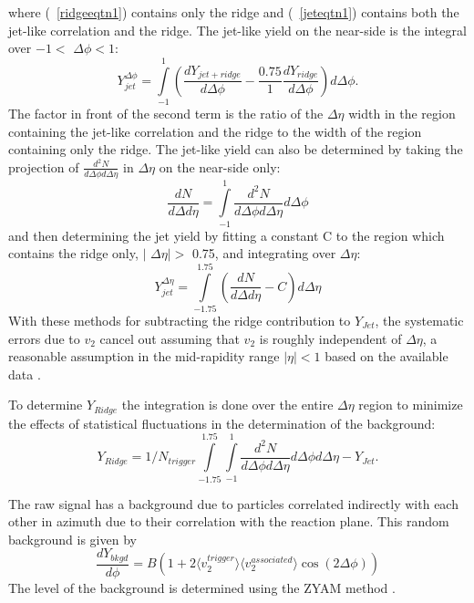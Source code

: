 \documentclass[aps,prc,twocolumn,groupedaddress,showpacs,preprintnumbers,amsmath,amssymb]{revtex4}
\newcommand{\jet}{jet-like correlation\xspace}
\newcommand{\ridge}{ridge\xspace}
\newcommand{\dphi}{$\Delta\phi$\xspace}
\newcommand{\deta}{$\Delta\eta$\xspace}
\newcommand{\vtwo}{$v_2$\xspace}
\newcommand{\ns}{near-side\xspace}
\newcommand{\nearside}{near-side\xspace}
\newcommand{\jl}{jet-like\xspace}
\newcommand{\Eref}[1]{(~\ref{#1})}
\newcommand{\njet}{$Y_{Jet}$\xspace}
\newcommand{\nridge}{$Y_{Ridge}$\xspace}
\begin{document}
where \Eref{ridgeeqtn1} contains only the \ridge and \Eref{jeteqtn1} contains both the \jet and the \ridge.  The \jl yield on the \nearside is the integral over $-1<$ \dphi $<1$:
\begin{equation}
Y_{jet}^{\Delta\phi} = \int\limits_{-1}^{1} ( \frac{dY_{jet+ridge}}{d\Delta\phi} - \frac{0.75}{1}  \frac{dY_{ridge}}{d\Delta\phi} ) d\Delta\phi. \label{jetphieqtn}
\end{equation}
The factor in front of the second term is the ratio of the \deta width in the region containing the \jet and the \ridge to the width of the region containing only the \ridge.  The jet-like yield can also be determined by taking the projection of $\frac{d^2N}{d\Delta\phi d\Delta\eta}$ in \deta on the \ns only:
\begin{equation} 
\frac{dN}{d\Delta d\eta} = \int\limits_{-1}^{1} \frac{d^2N}{d\Delta\phi d\Delta\eta} d\Delta\phi \label{jeteqtn2}
\end{equation}
and then determining the jet yield by fitting a constant C to the region which contains the \ridge only, $|$ \deta $| >$ 0.75, and integrating over \deta:
\begin{equation} 
Y_{jet}^{\Delta\eta} = \int\limits_{-1.75}^{1.75} (\frac{dN}{d\Delta d\eta} - C) d\Delta\eta \label{jeteqtn3}
\end{equation}
With these methods for subtracting the \ridge contribution to \njet, the systematic errors due to \vtwo cancel out assuming that \vtwo is roughly independent of \deta, a reasonable assumption in the mid-rapidity range $|\eta| < 1$ based on the available data \cite{phobosFlow1,phobosFlow2}.

To determine \nridge the integration is done over the entire \deta region to minimize the effects of statistical fluctuations in the determination of the background:
\begin{equation}
Y_{Ridge} = 1/N_{trigger} \int\limits_{-1.75}^{1.75} \int\limits_{-1}^{1} \frac{d^2N}{d\Delta\phi d\Delta\eta} d\Delta\phi d\Delta\eta - Y_{Jet}.
\end{equation}

The raw signal has a background due to particles correlated indirectly with each other in azimuth due to their correlation with the reaction plane.  This random background is given by
\begin{equation}
\frac{dY_{bkgd}}{d\phi} = B (1 + 2 \langle v_2^{trigger}\rangle \langle v_2^{associated}\rangle \cos(2\Delta\phi) )
\end{equation}
The level of the background is determined using the ZYAM method \cite{starZYAM}.
\end{document}
